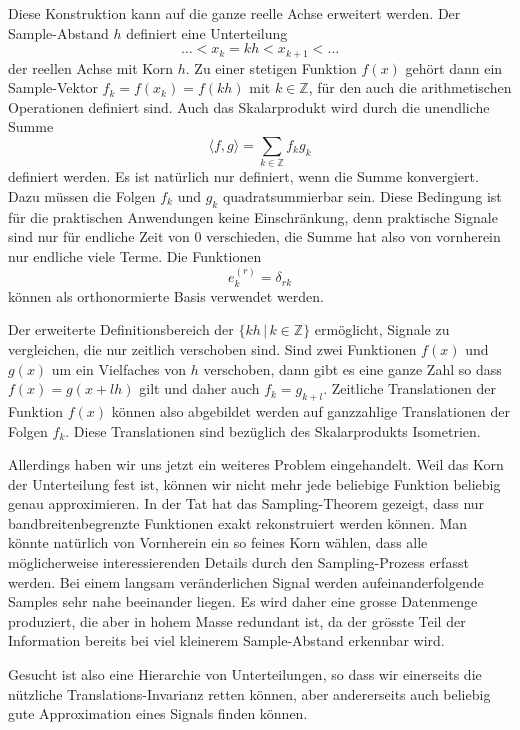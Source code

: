 Diese Konstruktion kann auf die ganze reelle Achse erweitert werden.
Der Sample-Abstand $h$ definiert eine Unterteilung
\[
\dots < x_{k} = kh < x_{k+1} < \dots
\]
der reellen Achse mit Korn $h$.
Zu einer stetigen Funktion $f(x)$ gehört dann ein Sample-Vektor
$f_k=f(x_k)=f(kh)$ mit $k\in\mathbb Z$, für den auch die
arithmetischen Operationen definiert sind.
Auch das Skalarprodukt wird durch die unendliche Summe
\[
\langle f, g\rangle
=
\sum_{k\in\mathbb Z} f_k g_k
\]
definiert werden.
Es ist natürlich nur definiert, wenn die Summe konvergiert.
Dazu müssen die Folgen $f_k$ und $g_k$ quadratsummierbar sein.
Diese Bedingung ist für die praktischen Anwendungen keine Einschränkung,
denn praktische Signale sind nur für endliche Zeit von $0$ verschieden,
die Summe hat also von vornherein nur endliche viele Terme.
Die Funktionen
\[
e^{(r)}_k = \delta_{rk}
\]
können als orthonormierte Basis verwendet werden.

Der erweiterte Definitionsbereich der $\{kh\,|\,k\in\mathbb Z\}$ ermöglicht,
Signale zu vergleichen, die nur zeitlich verschoben sind.
Sind zwei Funktionen $f(x)$ und $g(x)$ um ein Vielfaches von $h$ verschoben,
dann gibt es eine ganze Zahl so dass $f(x)=g(x+lh)$ gilt und daher auch
$f_k = g_{k+l}$.
Zeitliche Translationen der Funktion $f(x)$ können also abgebildet
werden auf ganzzahlige Translationen der Folgen $f_k$.
Diese Translationen sind bezüglich des Skalarprodukts Isometrien.

Allerdings haben wir uns jetzt ein weiteres Problem eingehandelt.
Weil das Korn der Unterteilung fest ist, können wir nicht mehr jede
beliebige Funktion beliebig genau approximieren.
In der Tat hat das Sampling-Theorem gezeigt, dass nur bandbreitenbegrenzte
Funktionen exakt rekonstruiert werden können.
Man könnte natürlich von Vornherein ein so feines Korn wählen, dass alle
möglicherweise interessierenden Details durch den Sampling-Prozess
erfasst werden.
Bei einem langsam veränderlichen Signal werden aufeinanderfolgende Samples
sehr nahe beeinander liegen.
Es wird daher eine grosse Datenmenge produziert, die aber in hohem
Masse redundant ist, da der grösste Teil der Information bereits bei
viel kleinerem Sample-Abstand erkennbar wird.

Gesucht ist also eine Hierarchie von Unterteilungen, so dass wir einerseits
die nützliche Translations-Invarianz retten können, aber andererseits auch
beliebig gute Approximation eines Signals finden können.



